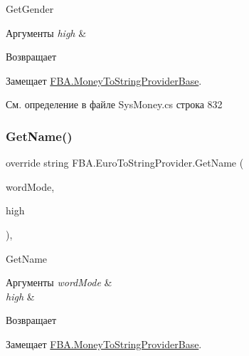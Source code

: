 Get\+Gender 


\begin{DoxyParams}{Аргументы}
{\em high} & \\
\hline
\end{DoxyParams}
\begin{DoxyReturn}{Возвращает}

\end{DoxyReturn}


Замещает \mbox{\hyperlink{class_f_b_a_1_1_money_to_string_provider_base_a24e1e1dcd1a4c42773d3ec0034a4ca6d}{F\+B\+A.\+Money\+To\+String\+Provider\+Base}}.



См. определение в файле Sys\+Money.\+cs строка 832

\mbox{\label{class_f_b_a_1_1_euro_to_string_provider_a6b40c1dc54b209d90c3440b0c76b5bbe}} 
\subsubsection{\texorpdfstring{Get\+Name()}{GetName()}}
{\footnotesize\ttfamily override string F\+B\+A.\+Euro\+To\+String\+Provider.\+Get\+Name (\begin{DoxyParamCaption}\item[{Number\+To\+Russian\+String.\+Word\+Mode}]{word\+Mode,  }\item[{bool}]{high }\end{DoxyParamCaption})\hspace{0.3cm}{\ttfamily [protected]}, {\ttfamily [virtual]}}



Get\+Name 


\begin{DoxyParams}{Аргументы}
{\em word\+Mode} & \\
\hline
{\em high} & \\
\hline
\end{DoxyParams}
\begin{DoxyReturn}{Возвращает}

\end{DoxyReturn}


Замещает \mbox{\hyperlink{class_f_b_a_1_1_money_to_string_provider_base_aea712eaf4a5d84eed5624e3d48988502}{F\+B\+A.\+Money\+To\+String\+Provider\+Base}}.




